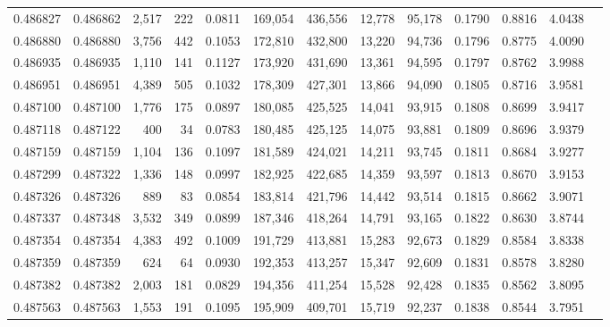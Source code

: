 \begin{tabular}{rrrrrrrrrrrrr}
0.486827 & 0.486862 & 2,517 &   222 &                                     0.0811 & 169,054 & 436,556 &  12,778 &  95,178 & 0.1790 & 0.8816 & 4.0438 \\
0.486880 & 0.486880 & 3,756 &   442 &                                     0.1053 & 172,810 & 432,800 &  13,220 &  94,736 & 0.1796 & 0.8775 & 4.0090 \\
0.486935 & 0.486935 & 1,110 &   141 &                                     0.1127 & 173,920 & 431,690 &  13,361 &  94,595 & 0.1797 & 0.8762 & 3.9988 \\
0.486951 & 0.486951 & 4,389 &   505 &                                     0.1032 & 178,309 & 427,301 &  13,866 &  94,090 & 0.1805 & 0.8716 & 3.9581 \\
0.487100 & 0.487100 & 1,776 &   175 &                                     0.0897 & 180,085 & 425,525 &  14,041 &  93,915 & 0.1808 & 0.8699 & 3.9417 \\
0.487118 & 0.487122 &   400 &    34 &                                     0.0783 & 180,485 & 425,125 &  14,075 &  93,881 & 0.1809 & 0.8696 & 3.9379 \\
0.487159 & 0.487159 & 1,104 &   136 &                                     0.1097 & 181,589 & 424,021 &  14,211 &  93,745 & 0.1811 & 0.8684 & 3.9277 \\
0.487299 & 0.487322 & 1,336 &   148 &                                     0.0997 & 182,925 & 422,685 &  14,359 &  93,597 & 0.1813 & 0.8670 & 3.9153 \\
0.487326 & 0.487326 &   889 &    83 &                                     0.0854 & 183,814 & 421,796 &  14,442 &  93,514 & 0.1815 & 0.8662 & 3.9071 \\
0.487337 & 0.487348 & 3,532 &   349 &                                     0.0899 & 187,346 & 418,264 &  14,791 &  93,165 & 0.1822 & 0.8630 & 3.8744 \\
0.487354 & 0.487354 & 4,383 &   492 &                                     0.1009 & 191,729 & 413,881 &  15,283 &  92,673 & 0.1829 & 0.8584 & 3.8338 \\
0.487359 & 0.487359 &   624 &    64 &                                     0.0930 & 192,353 & 413,257 &  15,347 &  92,609 & 0.1831 & 0.8578 & 3.8280 \\
0.487382 & 0.487382 & 2,003 &   181 &                                     0.0829 & 194,356 & 411,254 &  15,528 &  92,428 & 0.1835 & 0.8562 & 3.8095 \\
0.487563 & 0.487563 & 1,553 &   191 &                                     0.1095 & 195,909 & 409,701 &  15,719 &  92,237 & 0.1838 & 0.8544 & 3.7951 \\

\end{tabular}
